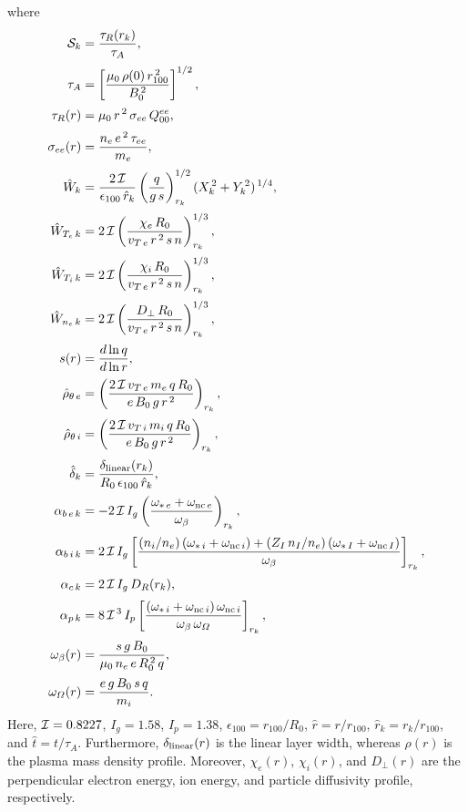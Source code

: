\documentclass[notitlepage,12pt]{article}
\begin{document}
where
\begin{align}\label{e23}
{\cal S}_k&=\frac{\tau_R(r_k)}{\tau_A},\\[0.5ex]
\tau_A &= \left[\frac{\mu_0\,\rho(0)\,r_{100}^{\,2}}{B_0^{\,2}}\right]^{1/2},\\[0.5ex]
\tau_R(r) &= \mu_0\,r^{\,2}\,\sigma_{ee}\,Q_{00}^{ee},\\[0.5ex]
\sigma_{ee}(r) &=\frac{n_e\,e^{\,2}\,\tau_{ee}}{m_e},\\[0.5ex]
\hat{W}_k &=\frac{2\,{\cal I}}{\epsilon_{100}\,\hat{r}_k}\left(\frac{q}{g\,s}\right)^{1/2}_{r_k} (X_k^{\,2} + Y_k^{\,2})^{\,1/4},\\[0.5ex]
\hat{W}_{T_e\,k} &= 2\,{\cal I}\left(\frac{\chi_e\,R_0}{v_{T\,e}\,r^{\,2}\,s\,n}\right)^{1/3}_{r_k},\\[0.5ex]
\hat{W}_{T_i\,k} &= 2\,{\cal I}\left(\frac{\chi_i\,R_0}{v_{T\,e}\,r^{\,2}\,s\,n}\right)^{1/3}_{r_k},\\[0.5ex]
\hat{W}_{n_e\,k} &= 2\,{\cal I}\left(\frac{D_\perp\,R_0}{v_{T\,e}\,r^{\,2}\,s\,n}\right)^{1/3}_{r_k},\\[0.5ex]
s(r) &= \frac{d\ln q}{d\ln r},\\[0.5ex]
\hat{\rho}_{\theta\,e} &= \left(\frac{2\,{\cal I}\,v_{T\,e}\,m_e\,q\,R_0}{e\,B_0\,g\,r^{\,2}}\right)_{r_k},\\[0.5ex]
\hat{\rho}_{\theta\,i} &= \left(\frac{2\,{\cal I}\,v_{T\,i}\,m_i\,q\,R_0}{e\,B_0\,g\,r^{\,2}}\right)_{r_k},\\[0.5ex]
\hat{\delta}_k &= \frac{\delta_{\rm linear}(r_k)}{R_0\,\epsilon_{100}\,\hat{r}_k},\\[0.5ex]
\alpha_{b\,e\,k} &= -2\,{\cal I}\,I_g\left(\frac{\omega_{\ast\,e}+\omega_{{\rm nc}\,e}}{\omega_\beta}\right)_{r_k},\\[0.5ex]
\alpha_{b\,i\,k} &= 2\,{\cal I}\,I_g\left[\frac{(n_i/n_e)\left(\omega_{\ast\,i}+\omega_{{\rm nc}\,i}\right)+(Z_I\,n_I/n_e)\left(\omega_{\ast\,I}+\omega_{{\rm nc}\,I}\right)}{\omega_\beta}\right]_{r_k},\\[0.5ex]
\alpha_{c\,k} &= 2\,{\cal I}\,I_g\,D_R(r_k),\\[0.5ex]
\alpha_{p\,k} &= 8\,{\cal I}^{\,3}\, I_p\left[\frac{(\omega_{\ast\,i}+\omega_{{\rm nc}\,i})\,\omega_{{\rm nc}\,i}}{\omega_\beta\,\omega_{\mit\Omega}}\right]_{r_k},\\[0.5ex]
\omega_{\beta}(r)&= \frac{s\,g\,B_0}{\mu_0\,n_e\,e\,R_0^{\,2}\,q},\\[0.5ex]
\omega_{\mit\Omega}(r)&= \frac{e\,g\,B_0\,s\,q}{m_i}.
\end{align}
Here, ${\cal I}=0.8227$, $I_g=1.58$, $I_p=1.38$, $\epsilon_{100}=r_{100}/R_0$, $\hat{r}=r/r_{100}$, $\hat{r}_k=r_k/r_{100}$, and $\hat{t}=t/\tau_A$. Furthermore, $\delta_{\rm linear}(r)$ is the linear layer width, whereas $\rho(r)$ is the plasma
mass density profile. Moreover, $\chi_e(r)$, $\chi_i(r)$, and $D_\perp(r)$ are the perpendicular electron
energy, ion energy, and particle diffusivity profile, respectively. 
\end{document}
